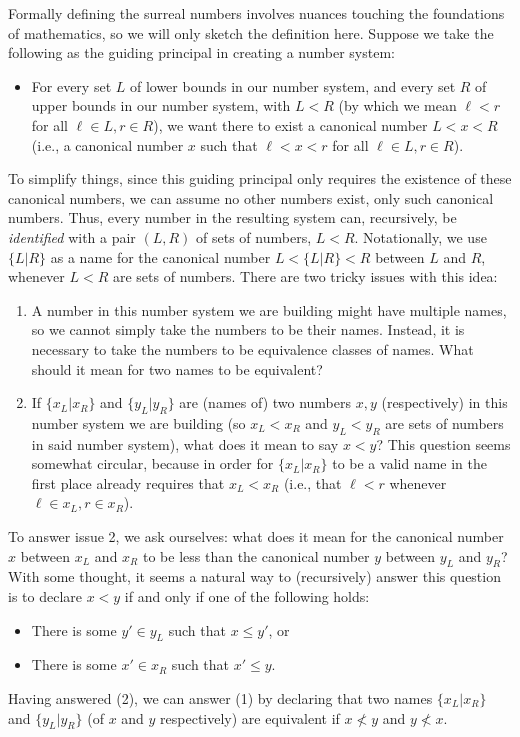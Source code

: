 \documentclass[twoside,11pt]{article}
\begin{document}
Formally defining the surreal numbers involves nuances touching the foundations
of mathematics, so we will only sketch the definition here.
Suppose we take the following as the guiding principal in creating a number system:
\begin{itemize}
    \item
    For every set $L$ of lower bounds in our number system, and every set $R$ of
    upper bounds in our number system, with $L<R$ (by which we mean $\ell<r$
    for all $\ell\in L, r\in R$), we want there to exist a canonical number
    $L<x<R$ (i.e., a canonical number $x$ such that $\ell<x<r$ for all
    $\ell\in L, r\in R$).
\end{itemize}
To simplify things, since this guiding principal only requires the existence of
these canonical numbers, we can assume no other numbers exist, only such canonical
numbers. Thus, every number in the resulting system can, recursively, be
\emph{identified} with a pair $(L,R)$ of sets of numbers, $L<R$. Notationally,
we use $\{L|R\}$ as a name for the canonical number $L<\{L|R\}<R$ between $L$ and $R$,
whenever $L<R$ are sets of numbers. There are two tricky issues with this idea:
\begin{enumerate}
    \item
    A number in this number system we are building might have multiple names,
    so we cannot simply take the numbers to be their names. Instead, it is necessary
    to take the numbers to be equivalence classes of names.
    What should it mean for two names to be equivalent?
    \item
    If $\{x_L|x_R\}$ and $\{y_L|y_R\}$ are (names of) two numbers $x,y$ (respectively)
    in this number system we are building
    (so $x_L<x_R$ and $y_L<y_R$ are sets of numbers in said number system),
    what does it mean to say $x<y$? This question seems
    somewhat circular, because in order for $\{x_L|x_R\}$ to be a valid name in the
    first place already requires that $x_L<x_R$ (i.e., that $\ell<r$ whenever
    $\ell\in x_L,r\in x_R$).
\end{enumerate}
To answer issue 2, we ask ourselves: what does it mean for the canonical number
$x$ between $x_L$ and $x_R$ to be less than the canonical number $y$ between $y_L$ and $y_R$?
With some thought, it seems a natural way to (recursively)
answer this question is to declare $x<y$ if
and only if one of the following holds:
\begin{itemize}
    \item There is some $y'\in y_L$ such that $x\leq y'$, or
    \item There is some $x'\in x_R$ such that $x'\leq y$.
\end{itemize}
Having answered (2), we can answer (1) by declaring that two names
$\{x_L|x_R\}$ and $\{y_L|y_R\}$ (of $x$ and $y$ respectively) are equivalent
if $x\not<y$ and $y\not< x$.
\end{document}
